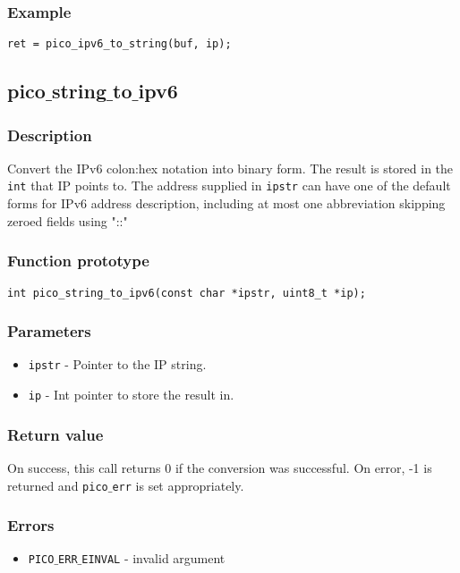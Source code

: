 \subsubsection*{Example}
\begin{verbatim}
ret = pico_ipv6_to_string(buf, ip);
\end{verbatim}

\subsection{pico$\_$string$\_$to$\_$ipv6}

\subsubsection*{Description}
Convert the IPv6 colon:hex notation into binary form. The result is stored in the
\texttt{int} that IP points to. 
The address supplied in \texttt{ipstr} can have one of the default forms for IPv6 address
description, including at most one abbreviation skipping zeroed fields using "::"

\subsubsection*{Function prototype}
\begin{verbatim}
int pico_string_to_ipv6(const char *ipstr, uint8_t *ip); 
\end{verbatim}

\subsubsection*{Parameters}
\begin{itemize}[noitemsep]
\item \texttt{ipstr} - Pointer to the IP string.
\item \texttt{ip} - Int pointer to store the result in.
\end{itemize}

\subsubsection*{Return value}
On success, this call returns 0 if the conversion was successful.
On error, -1 is returned and \texttt{pico$\_$err} is set appropriately.

\subsubsection*{Errors}
\begin{itemize}[noitemsep]
\item \texttt{PICO$\_$ERR$\_$EINVAL} - invalid argument
\end{itemize}

